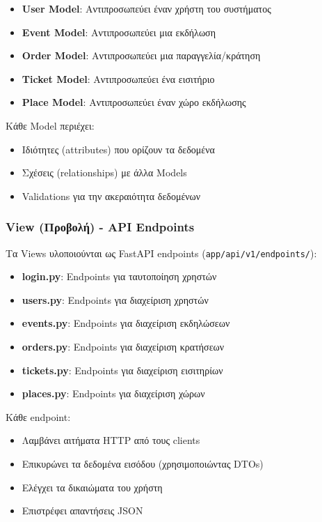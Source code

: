\documentclass[12pt,a4paper]{report}
\begin{document}
\begin{itemize}
    \item \textbf{User Model}: Αντιπροσωπεύει έναν χρήστη του συστήματος
    \item \textbf{Event Model}: Αντιπροσωπεύει μια εκδήλωση
    \item \textbf{Order Model}: Αντιπροσωπεύει μια παραγγελία/κράτηση
    \item \textbf{Ticket Model}: Αντιπροσωπεύει ένα εισιτήριο
    \item \textbf{Place Model}: Αντιπροσωπεύει έναν χώρο εκδήλωσης
\end{itemize}

Κάθε Model περιέχει:
\begin{itemize}
    \item Ιδιότητες (attributes) που ορίζουν τα δεδομένα
    \item Σχέσεις (relationships) με άλλα Models
    \item Validations για την ακεραιότητα δεδομένων
\end{itemize}

\subsubsection{View (Προβολή) - API Endpoints}

Τα Views υλοποιούνται ως FastAPI endpoints (\texttt{app/api/v1/endpoints/}):

\begin{itemize}
    \item \textbf{login.py}: Endpoints για ταυτοποίηση χρηστών
    \item \textbf{users.py}: Endpoints για διαχείριση χρηστών
    \item \textbf{events.py}: Endpoints για διαχείριση εκδηλώσεων
    \item \textbf{orders.py}: Endpoints για διαχείριση κρατήσεων
    \item \textbf{tickets.py}: Endpoints για διαχείριση εισιτηρίων
    \item \textbf{places.py}: Endpoints για διαχείριση χώρων
\end{itemize}

Κάθε endpoint:
\begin{itemize}
    \item Λαμβάνει αιτήματα HTTP από τους clients
    \item Επικυρώνει τα δεδομένα εισόδου (χρησιμοποιώντας DTOs)
    \item Ελέγχει τα δικαιώματα του χρήστη
    \item Επιστρέφει απαντήσεις JSON
\end{itemize}
\end{document}
